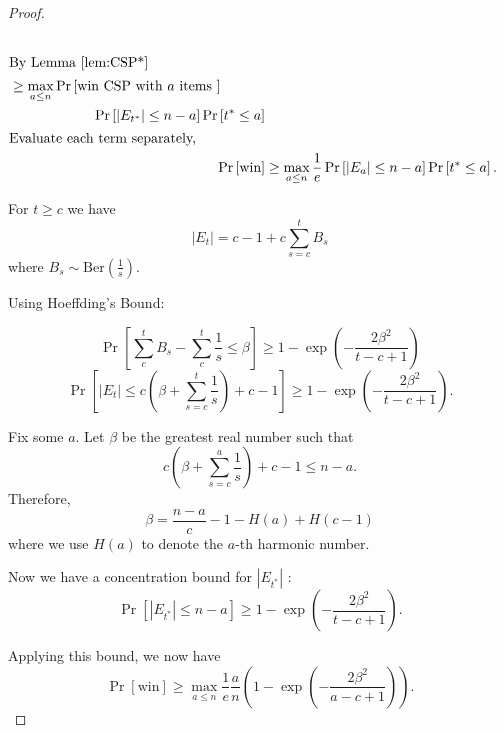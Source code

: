 \begin{proof}
\begin{align}
\begin{split}
	 \end{split}\\
	 \intertext{By Lemma \ref{lem:CSP*}}
	 \begin{split}
	   &\ge  \max_{a \le n} \operatorname{Pr}\left[{\text{win CSP with }a \text{ items } }\right] \\
	   &\qquad\qquad\qquad \operatorname{Pr}\left[{|E_{t^*}|\le n-a}\right] \operatorname{Pr}\left[{t^* \le a}\right]\\
	 \end{split}\\
	 \intertext{Evaluate each term separately,}
	 \operatorname{Pr}\left[{\text{win}}\right] 
	   &\ge \max_{a \le n} \frac{1}{e } \operatorname{Pr}\left[{|E_a|\le n-a}\right] \operatorname{Pr}\left[{t^*\le a}\right]
.\end{align}

For $t\ge c$ we have 
\begin{equation}
|E_t| = c-1+c \sum_{s=c}^{t} B_s
\end{equation}  
where $B_s \sim \text{Ber}(\frac{1}{s })$.

Using Hoeffding's Bound:

\begin{equation}
\operatorname{Pr}\left[{\sum_c^t B_s - \sum_c^t \frac{1}{s } \le \beta}\right] \ge 1-\exp\left( - \frac{2\beta^2}{t-c+1} \right) 
\end{equation} 
\begin{equation}
\operatorname{Pr}\left[{|E_t| \le c(\beta+\sum_{s=c }^t \frac{1}{s })+c-1}\right]\ge 1-\exp\left( - \frac{2\beta^2}{t-c+1} \right) 
.\end{equation} 

Fix some $a$. Let $\beta$ be the greatest real number such that 
\begin{equation}
c(\beta+\sum_{s=c }^a \frac{1}{s })+c-1 \le n-a
.\end{equation} 
Therefore,  
\begin{equation}
\beta = \frac{n-a}{c} -1 - H(a)+H(c-1)
\end{equation} 
where we use $H(a)$ to denote the $a $-th harmonic number.

Now we have a concentration bound for $|E_{t^*}|$ :
\begin{equation}
	\operatorname{Pr}\left[{|E_{t^*}| \le n-a}\right]\ge 1-\exp\left( - \frac{2\beta^2}{t-c+1} \right) 
.\end{equation} 

Applying this bound, we now have
\begin{equation}
	\operatorname{Pr}\left[{\text{win}}\right] \ge  \max_{a\le n } \frac{1}{e } \frac{a}{n } \left( 1-\exp\left( - \frac{2\beta^2}{a-c+1} \right)  \right) 
	.
\end{equation}

\end{proof}

